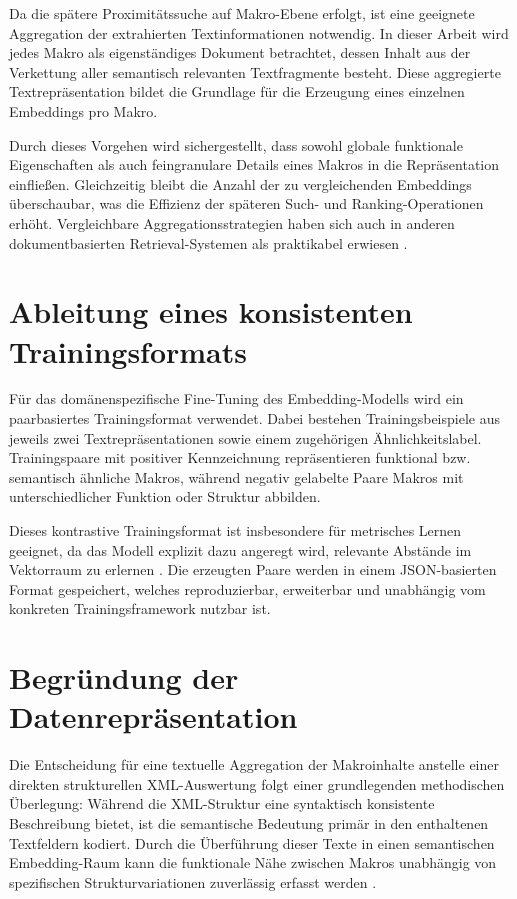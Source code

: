 Da die spätere Proximitätssuche auf Makro-Ebene erfolgt, ist eine geeignete Aggregation der extrahierten Textinformationen notwendig. In dieser Arbeit wird jedes Makro als eigenständiges Dokument betrachtet, dessen Inhalt aus der Verkettung aller semantisch relevanten Textfragmente besteht. Diese aggregierte Textrepräsentation bildet die Grundlage für die Erzeugung eines einzelnen Embeddings pro Makro.

Durch dieses Vorgehen wird sichergestellt, dass sowohl globale funktionale Eigenschaften als auch feingranulare Details eines Makros in die Repräsentation einfließen. Gleichzeitig bleibt die Anzahl der zu vergleichenden Embeddings überschaubar, was die Effizienz der späteren Such- und Ranking-Operationen erhöht. Vergleichbare Aggregationsstrategien haben sich auch in anderen dokumentbasierten Retrieval-Systemen als praktikabel erwiesen \cite{caspari_beyond_2024}.

\section{Ableitung eines konsistenten Trainingsformats}

Für das domänenspezifische Fine-Tuning des Embedding-Modells wird ein paarbasiertes Trainingsformat verwendet. Dabei bestehen Trainingsbeispiele aus jeweils zwei Textrepräsentationen sowie einem zugehörigen Ähnlichkeitslabel. Trainingspaare mit positiver Kennzeichnung repräsentieren funktional bzw. semantisch ähnliche Makros, während negativ gelabelte Paare Makros mit unterschiedlicher Funktion oder Struktur abbilden.

Dieses kontrastive Trainingsformat ist insbesondere für metrisches Lernen geeignet, da das Modell explizit dazu angeregt wird, relevante Abstände im Vektorraum zu erlernen \cite{parthasarathy_ultimate_2024}. Die erzeugten Paare werden in einem JSON-basierten Format gespeichert, welches reproduzierbar, erweiterbar und unabhängig vom konkreten Trainingsframework nutzbar ist.

\section{Begründung der Datenrepräsentation}

Die Entscheidung für eine textuelle Aggregation der Makroinhalte anstelle einer direkten strukturellen XML-Auswertung folgt einer grundlegenden methodischen Überlegung: Während die XML-Struktur eine syntaktisch konsistente Beschreibung bietet, ist die semantische Bedeutung primär in den enthaltenen Textfeldern kodiert. Durch die Überführung dieser Texte in einen semantischen Embedding-Raum kann die funktionale Nähe zwischen Makros unabhängig von spezifischen Strukturvariationen zuverlässig erfasst werden \cite{gower}.

